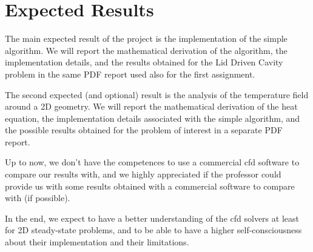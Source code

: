 \section{Expected Results}

The main expected result of the project is the implementation of the \acrshort{simple} algorithm.
We will report the mathematical derivation of the algorithm, the implementation details, and the results obtained for the Lid Driven Cavity problem in the same PDF report used also for the first assignment.

The second expected (and optional) result is the analysis of the temperature field around a 2D geometry.
We will report the mathematical derivation of the heat equation, the implementation details associated with the \acrshort{simple} algorithm, and the possible results obtained for the problem of interest in a separate PDF report.

Up to now, we don't have the competences to use a commercial \acrshort{cfd} software to compare our results with, and we highly appreciated if the professor could provide us with some results obtained with a commercial software to compare with (if possible).

In the end, we expect to have a better understanding of the \acrshort{cfd} solvers at least for 2D steady-state problems, and to be able to have a higher self-consciousness about their implementation and their limitations.